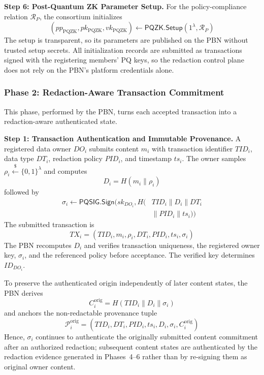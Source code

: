 \documentclass[lettersize,journal]{IEEEtran}
\begin{document}
\textbf{Step 6: Post-Quantum ZK Parameter Setup.}
For the policy-compliance relation $\mathcal{R}_P$, the consortium
initializes
\begin{equation}
(pp_{\mathrm{PQZK}},pk_{\mathrm{PQZK}},vk_{\mathrm{PQZK}})
\leftarrow
\mathsf{PQZK.Setup}(1^\lambda,\mathcal{R}_P)
\end{equation}
The setup is transparent, so its parameters are published on the PBN
without trusted setup secrets. All initialization records are submitted
as transactions signed with the registering members' PQ keys, so the
redaction control plane does not rely on the PBN's platform credentials
alone.
    
    
    
   \subsubsection*{\textbf{Phase 2: Redaction-Aware Transaction Commitment}}

This phase, performed by the PBN, turns each accepted transaction into
a redaction-aware authenticated state.

\medskip
\noindent\textbf{Step 1: Transaction Authentication and Immutable
Provenance.}
A registered data owner $DO_i$ submits content $m_i$ with transaction
identifier $TID_i$, data type $DT_i$, redaction policy $PID_i$, and
timestamp $ts_i$. The owner samples
$\rho_i\stackrel{\$}{\leftarrow}\{0,1\}^{\lambda}$ and computes
\begin{equation}
D_i=H(m_i\parallel\rho_i)
\end{equation}
followed by
\begin{equation}
\begin{aligned}
\sigma_i\leftarrow
\mathsf{PQSIG.Sign}\big(
sk_{DO_i},
H(&TID_i\parallel D_i\parallel DT_i\\
&\parallel PID_i\parallel ts_i)\big)
\end{aligned}
\end{equation}
The submitted transaction is
\begin{equation}
TX_i=(TID_i,m_i,\rho_i,DT_i,PID_i,ts_i,\sigma_i)
\end{equation}
The PBN recomputes $D_i$ and verifies transaction uniqueness, the
registered owner key, $\sigma_i$, and the referenced policy before
acceptance. The verified key determines $ID_{DO_i}$.

To preserve the authenticated origin independently of later content
states, the PBN derives
\begin{equation}
C_i^{\mathrm{orig}}
=
H(TID_i\parallel D_i\parallel\sigma_i)
\end{equation}
and anchors the non-redactable provenance tuple
\begin{equation}
\mathcal{P}_i^{\mathrm{orig}}
=
(TID_i,DT_i,PID_i,ts_i,D_i,\sigma_i,C_i^{\mathrm{orig}})
\end{equation}
Hence, $\sigma_i$ continues to authenticate the originally submitted
content commitment after an authorized redaction; subsequent content
states are authenticated by the redaction evidence generated in
Phases~4--6 rather than by re-signing them as original owner content.
\end{document}
